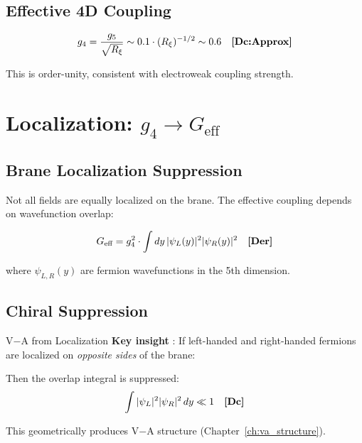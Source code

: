 \subsection{Effective 4D Coupling}

\begin{equation}
g_4 = \frac{g_5}{\sqrt{R_\xi}} \sim 0.1 \cdot (R_\xi)^{-1/2} \sim 0.6 \quad \textbf{[Dc:Approx]}
\end{equation}

This is order-unity, consistent with electroweak coupling strength.

\section{Localization: $g_4 \to G_{\text{eff}}$}
\label{sec:localization}

\subsection{Brane Localization Suppression}

Not all fields are equally localized on the brane. The effective coupling
depends on wavefunction overlap:

\begin{equation}
G_{\text{eff}} = g_4^2 \cdot \int dy \, |\psi_L(y)|^2 |\psi_R(y)|^2 \quad \textbf{[Der]}
\end{equation}

where $\psi_{L,R}(y)$ are fermion wavefunctions in the 5th dimension.

\subsection{Chiral Suppression}

\begin{mechanism}{V$-$A from Localization}
\textbf{Key insight} \tagDc{}:
If left-handed and right-handed fermions are localized on
\textit{opposite sides} of the brane:

\begin{center}
\end{center}

Then the overlap integral is suppressed:
\begin{equation}
\int |\psi_L|^2 |\psi_R|^2 \, dy \ll 1 \quad \textbf{[Dc]}
\end{equation}

This geometrically produces V$-$A structure (Chapter~\ref{ch:va_structure}).
\end{mechanism}

